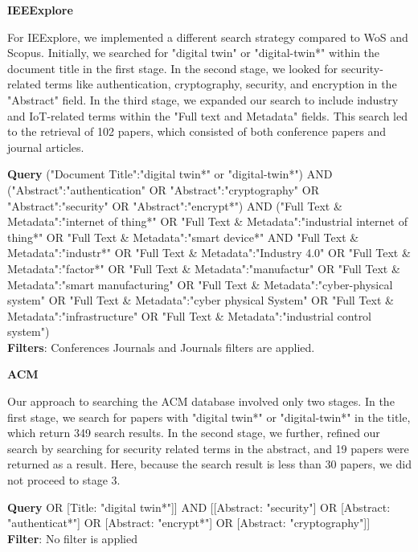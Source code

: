 \textbf{IEEExplore}

For IEExplore, we implemented a different search strategy compared to WoS and Scopus. Initially, we searched for "digital twin" or "digital-twin*" within the document title in the first stage. In the second stage, we looked for security-related terms like authentication, cryptography, security, and encryption in the "Abstract" field. In the third stage, we expanded our search to include industry and IoT-related terms within the "Full text and Metadata" fields. This search led to the retrieval of 102 papers, which consisted of both conference papers and journal articles.

\begin{tcolorbox}[colback=black!5!white, sharp corners=all, colframe=white!95!black]
\textbf{Query}
\tcblower
("Document Title":"digital twin*" or "digital-twin*") AND ("Abstract":"authentication" OR "Abstract":"cryptography" OR "Abstract":"security" OR "Abstract":"encrypt*") AND ("Full Text \& Metadata":"internet of thing*" OR "Full Text \& Metadata":"industrial internet of thing*" OR "Full Text \& Metadata":"smart device*" AND "Full Text \& Metadata":"industr*" OR "Full Text \& Metadata":"Industry 4.0" OR "Full Text \& Metadata":"factor*" OR "Full Text \& Metadata":"manufactur" OR "Full Text \& Metadata":"smart manufacturing" OR "Full Text \& Metadata":"cyber-physical system" OR "Full Text \& Metadata":"cyber physical System" OR "Full Text \& Metadata":"infrastructure" OR "Full Text \& Metadata":"industrial control system") \\

\textbf{Filters}: Conferences Journals and Journals filters are applied. 
\end{tcolorbox}

\textbf{ACM}

Our approach to searching the ACM database involved only two stages. In the first stage, we search for papers with "digital twin*" or "digital-twin*" in the title, which return 349 search results. In the second stage, we further, refined our search by searching for security related terms in the abstract, and 19 papers were returned as a result. Here, because the search result is less than 30 papers, we did not proceed to stage 3.

\begin{tcolorbox}[colback=black!5!white, sharp corners=all, colframe=white!95!black]
\textbf{Query}
\tcblower
[[Title: "digital-twin*"] OR [Title: "digital twin*"]] AND [[Abstract: "security"] OR [Abstract: "authenticat*"] OR [Abstract: "encrypt*"] OR [Abstract: "cryptography"]]\\

\textbf{Filter}: No filter is applied

\end{tcolorbox}


